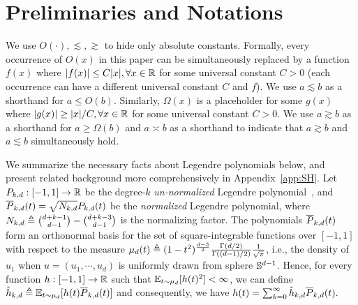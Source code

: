 \section{Preliminaries and Notations} \label{sec:preliminaries}

We use $O(\cdot), \lesssim, \gtrsim$ to hide only absolute constants. Formally, every occurrence of $O(x)$ in this paper can be simultaneously replaced by a function $f(x)$ where $|f(x)|\le C|x|,\forall x\in\mathbb{R}$ for some universal constant $C>0$ (each occurrence can have a different universal constant $C$ and $f$). We use $a \lesssim b$ as a shorthand for $a\le O(b)$. Similarly, $\Omega(x)$ is a placeholder for some $g(x)$ where $|g(x)|\ge |x|/C,\forall x\in\mathbb{R}$ for some universal constant $C>0$. We use $a \gtrsim b$ as a shorthand for $a \ge \Omega(b)$ and $a \asymp b$ as a shorthand to indicate that $a \gtrsim b$ and $a \lesssim b$ simultaneously hold.



 We summarize the necessary facts about Legendre polynomials below, and present related background more comprehensively in Appendix~\ref{app:SH}. Let ${P_{k, d}}:[-1,1]\to\mathbb{R}$ be the degree-$k$ \textit{un-normalized} Legendre polynomial~\citep{atkinson2012spherical}, and $\overline{P}_{k, d}(t) = \sqrt{{N_{k, d}}} {P_{k, d}}(t)$  be the \textit{normalized} Legendre polynomial, where ${N_{k, d}}\triangleq \binom{d+k-1}{d-1} - \binom{d+k-3}{d-1}$ is the normalizing factor. The polynomials $\overline{P}_{k, d}(t)$ form an orthonormal basis for the set of square-integrable functions over $[-1,1]$ with respect to the measure $\mu_d(t)\triangleq (1-t^2)^{\frac{d-3}{2}}\frac{\Gamma(d/2)}{\Gamma((d-1)/2)}\frac{1}{\sqrt{\pi}}$, i.e., the density of $u_1$ when $u=(u_1,\cdots,u_d)$ is uniformly drawn from sphere $\mathbb{S}^{d-1}$. Hence, for every function $h:[-1,1]\to \mathbb{R}$ such that $\operatorname*{\mathbb{E}}_{t\sim \mu_d}[h(t)^2]<\infty$, we can define $\hat{h}_{k, d}\triangleq \operatorname*{\mathbb{E}}_{t\sim\mu_d}[h(t)\overline{P}_{k, d}(t)]$ and consequently, we have
$
    \textstyle{h(t)=\sum_{k=0}^{\infty}\hat{h}_{k, d}\overline{P}_{k, d}(t).}
$






